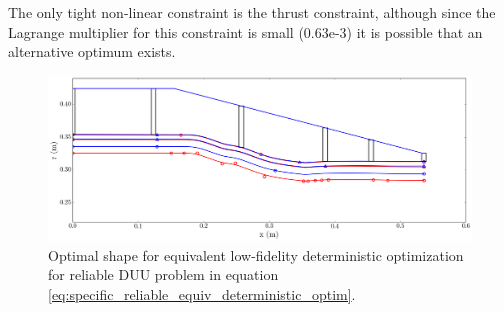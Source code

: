 \documentclass{article}
\begin{document}
The only tight non-linear constraint is the thrust constraint, although since the Lagrange multiplier for this constraint is small (0.63e-3) it is possible that an alternative optimum exists.

\begin{figure}
\caption{Optimal shape for equivalent low-fidelity deterministic optimization for reliable DUU problem in equation \ref{eq:specific_reliable_equiv_deterministic_optim}.}
\label{fig:det-lo-optimal-shape}
\begin{center}
\includegraphics[scale=0.35]{figs/det-lo-optimal-shape.png}
\end{center}
\end{figure}
\end{document}
